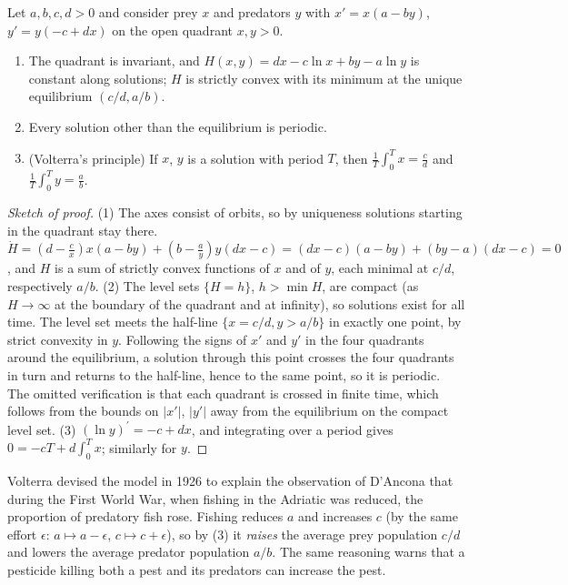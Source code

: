 \begin{proposition}\label{ordinary-differential-equations:proposition-lotka-volterra}
Let $a, b, c, d > 0$ and consider prey $x$ and predators $y$ with $x' = x(a - by)$, $y' = y(-c + dx)$ on the open quadrant $x, y > 0$.
\begin{enumerate}
\item The quadrant is invariant, and $H(x, y) = dx - c\ln x + by - a\ln y$ is constant along solutions; $H$ is strictly convex with its minimum at the unique equilibrium $(c/d, a/b)$.
\item Every solution other than the equilibrium is periodic.
\item (Volterra's principle) If $x$, $y$ is a solution with period $T$, then $\frac1T\int_0^Tx = \frac cd$ and $\frac1T\int_0^Ty = \frac ab$.
\end{enumerate}
\end{proposition}

\begin{proof}[Sketch of proof]
(1) The axes consist of orbits, so by uniqueness solutions starting in the quadrant stay there. $\dot H = (d - \frac cx)x(a - by) + (b - \frac ay)y(dx - c) = (dx - c)(a - by) + (by - a)(dx - c) = 0$, and $H$ is a sum of strictly convex functions
of $x$ and of $y$, each minimal at $c/d$, respectively $a/b$. (2) The level sets $\{H = h\}$, $h > \min H$, are compact (as $H \to \infty$ at the boundary of the quadrant and at infinity), so solutions exist for all time. The level set
meets the half-line $\{x = c/d, y > a/b\}$ in exactly one point, by strict convexity in $y$. Following the signs of $x'$ and $y'$ in the four quadrants around the equilibrium, a solution through this point crosses the four quadrants in
turn and returns to the half-line, hence to the same point, so it is periodic. The omitted verification is that each quadrant is crossed in finite time, which follows from the bounds on $|x'|$, $|y'|$ away from the equilibrium on the
compact level set. (3) $(\ln y)^{\prime} = -c + dx$, and integrating over a period gives $0 = -cT + d\int_0^Tx$; similarly for $y$.
\end{proof}

Volterra devised the model in 1926 to explain the observation of D'Ancona that during the First World War, when fishing in the Adriatic was reduced, the proportion of predatory fish rose. Fishing reduces $a$ and increases $c$
(by the same effort $\epsilon$: $a \mapsto a - \epsilon$, $c \mapsto c + \epsilon$), so by (3) it \emph{raises} the average prey population $c/d$ and lowers the average predator population $a/b$. The same reasoning warns that a pesticide
killing both a pest and its predators can increase the pest.

